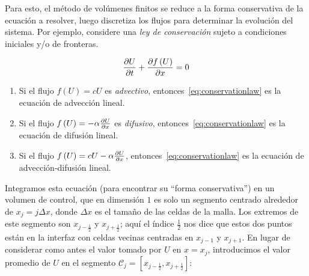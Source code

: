 Para esto, el método de volúmenes finitos se reduce a la forma
conservativa de la ecuación a resolver, luego discretiza los flujos
para determinar la evolución del sistema.
Por ejemplo, considere una \emph{ley de conservación} sujeto a
condiciones iniciales y/o de fronteras.

\begin{equation}\label{eq:conservationlaw}
	\diffp{U}{t}+
	\diffp{
		f
		\left(U\right)
	}{x}=
	0
\end{equation}


\begin{enumerate}
	\item

	      Si el flujo
	      \begin{math}
		      f
		      \left(U\right)=
		      cU
	      \end{math}
	      es \emph{advectivo}, entonces~\eqref{eq:conservationlaw} es
	      la ecuación de advección lineal.

	\item


	      Si el flujo
	      \begin{math}
		      f
		      \left(U\right)=
		      -\alpha\diffp{U}{x}
	      \end{math}
	      es \emph{difusivo}, entonces~\eqref{eq:conservationlaw} es
	      la ecuación de difusión lineal.

	\item

	      Si el flujo
	      \begin{math}
		      f
		      \left(U\right)=
		      cU-
		      \alpha\diffp{U}{x}
	      \end{math},
	      entonces~\eqref{eq:conservationlaw} es la ecuación de
	      advección-difusión lineal.
\end{enumerate}

Integramos esta ecuación (para encontrar su ``forma conservativa'')
en un volumen de control, que en dimensión $1$ es solo un segmento
centrado alrededor de
\begin{math}
	x_{j}=
	j\Delta x
\end{math},
donde $\Delta x$ es el tamaño de las celdas de la malla.
Los extremos de este segmento son $x_{j-\frac{1}{2}}$ y
$x_{j+\frac{1}{2}}$; aquí el índice $\frac{1}{2}$ nos dice que estos
dos puntos están en la interfaz con celdas vecinas centradas en
$x_{j-1}$ y $x_{j+1}$.
En lugar de considerar como antes el valor tomado por $U$ en $x=x_{j}$,
introducimos el valor promedio de $U$ en el segmento
\begin{math}
	\mathcal{C}_{j}=
	\left[
		x_{j-\frac{1}{2}},
		x_{j+\frac{1}{2}}
		\right]
\end{math}:

